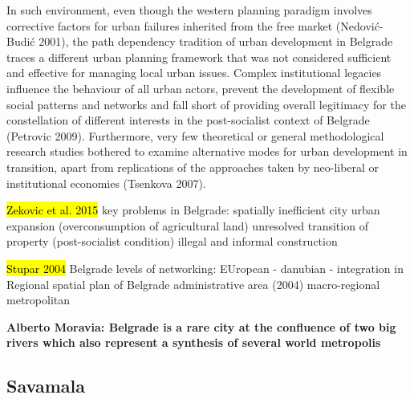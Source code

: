 \documentclass[11pt]{report}
\begin{document}
In such environment, even though the western planning paradigm involves corrective factors for urban failures inherited from the free market (Nedović-Budić 2001), the path dependency tradition of urban development in Belgrade traces a different urban planning framework that was not considered sufficient and effective for managing local urban issues. Complex institutional legacies influence the behaviour of all urban actors, prevent the development of flexible social patterns and networks and fall short of providing overall legitimacy for the constellation of different interests in the post-socialist context of Belgrade (Petrovic 2009). Furthermore, very few theoretical or general methodological research studies bothered to examine alternative modes for urban development in transition, apart from replications of the approaches taken by neo-liberal or institutional economies (Tsenkova 2007).

\hl{Zekovic et al. 2015}
key problems in Belgrade:
    spatially inefficient city
    urban expansion (overconsumption of agricultural land)
    unresolved transition of property (post-socialist condition)
    illegal and informal construction
    
\hl{Stupar 2004}
Belgrade levels of networking:
    EUropean - danubian - integration in  Regional  spatial  plan  of  Belgrade  administrative  area  (2004)
    macro-regional
    metropolitan
    
\textbf{Alberto Moravia: Belgrade is a rare city at the confluence of two big rivers which also represent a synthesis of several world metropolis}

\subsection{Savamala}
\end{document}

